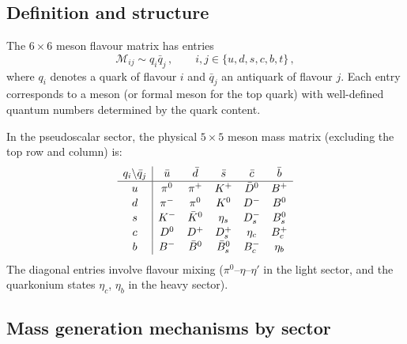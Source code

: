 \documentclass[11pt,a4paper]{article}
\theoremstyle{plain}
\begin{document}
\subsection{Definition and structure}

The $6 \times 6$ meson flavour matrix has entries
\begin{equation}\label{eq:meson-matrix}
  \mathcal{M}_{ij} \sim q_i \bar{q}_j\,,
  \qquad i,j \in \{u,d,s,c,b,t\}\,,
\end{equation}
where $q_i$ denotes a quark of flavour $i$ and $\bar{q}_j$ an antiquark
of flavour $j$.  Each entry corresponds to a meson (or formal meson for
the top quark) with well-defined quantum numbers determined by the quark
content.

In the pseudoscalar sector, the physical $5 \times 5$ meson mass matrix
(excluding the top row and column) is:
\begin{equation}\label{eq:mass-matrix-physical}
\renewcommand{\arraystretch}{1.1}
\begin{array}{c|ccccc}
  q_i \backslash \bar{q}_j & \bar{u} & \bar{d} & \bar{s}
  & \bar{c} & \bar{b} \\
\hline
u & \pi^0 & \pi^+ & K^+ & \bar{D}^0 & B^+ \\
d & \pi^- & \pi^0 & K^0 & D^- & B^0 \\
s & K^- & \bar{K}^0 & \eta_s & D_s^- & B_s^0 \\
c & D^0 & D^+ & D_s^+ & \eta_c & B_c^+ \\
b & B^- & \bar{B}^0 & \bar{B}_s^0 & B_c^- & \eta_b \\
\end{array}
\end{equation}
The diagonal entries involve flavour mixing ($\pi^0$--$\eta$--$\eta'$
in the light sector, and the quarkonium states $\eta_c$, $\eta_b$ in
the heavy sector).

\subsection{Mass generation mechanisms by sector}
\end{document}

